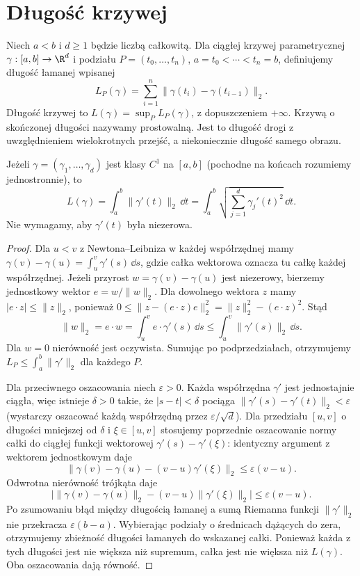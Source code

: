 \section{Długość krzywej}
\begin{definicja}
\label{ma1:def:curve-length}
Niech $a<b$ i $d\ge1$ będzie liczbą całkowitą. Dla ciągłej krzywej parametrycznej $\gamma:[a,b]\to\R^d$ i podziału $P=(t_0,\ldots,t_n)$, $a=t_0<\cdots<t_n=b$, definiujemy długość łamanej wpisanej
\[
 L_P(\gamma)=\sum_{i=1}^n\|\gamma(t_i)-\gamma(t_{i-1})\|_2.
\]
Długość krzywej to $L(\gamma)=\sup_P L_P(\gamma)$, z dopuszczeniem $+\infty$. Krzywą o skończonej długości nazywamy prostowalną. Jest to długość drogi z uwzględnieniem wielokrotnych przejść, a niekoniecznie długość samego obrazu.
\end{definicja}
\begin{twierdzenie}
\label{ma1:thm:curve-length}
Jeżeli $\gamma=(\gamma_1,\ldots,\gamma_d)$ jest klasy $C^1$ na $[a,b]$ (pochodne na końcach rozumiemy jednostronnie), to
\[
 L(\gamma)=\int_a^b\|\gamma'(t)\|_2\,\dd t
 =\int_a^b\sqrt{\sum_{j=1}^d\gamma_j'(t)^2}\,\dd t.
\]
Nie wymagamy, aby $\gamma'(t)$ była niezerowa.
\end{twierdzenie}
\begin{proof}
Dla $u<v$ z Newtona--Leibniza w każdej współrzędnej mamy $\gamma(v)-\gamma(u)=\int_u^v\gamma'(s)\,\dd s$, gdzie całka wektorowa oznacza tu całkę każdej współrzędnej. Jeżeli przyrost $w=\gamma(v)-\gamma(u)$ jest niezerowy, bierzemy jednostkowy wektor $e=w/\|w\|_2$. Dla dowolnego wektora $z$ mamy $|e\cdot z|\le\|z\|_2$, ponieważ $0\le\|z-(e\cdot z)e\|_2^2=\|z\|_2^2-(e\cdot z)^2$. Stąd
\[
 \|w\|_2=e\cdot w=\int_u^v e\cdot\gamma'(s)\,\dd s
 \le\int_u^v\|\gamma'(s)\|_2\,\dd s.
\]
Dla $w=0$ nierówność jest oczywista. Sumując po podprzedziałach, otrzymujemy $L_P\le\int_a^b\|\gamma'\|_2$ dla każdego $P$.

Dla przeciwnego oszacowania niech $\varepsilon>0$. Każda współrzędna $\gamma'$ jest jednostajnie ciągła, więc istnieje $\delta>0$ takie, że $|s-t|<\delta$ pociąga $\|\gamma'(s)-\gamma'(t)\|_2<\varepsilon$ (wystarczy oszacować każdą współrzędną przez $\varepsilon/\sqrt d$). Dla przedziału $[u,v]$ o długości mniejszej od $\delta$ i $\xi\in[u,v]$ stosujemy poprzednie oszacowanie normy całki do ciągłej funkcji wektorowej $\gamma'(s)-\gamma'(\xi)$: identyczny argument z wektorem jednostkowym daje
\[
 \|\gamma(v)-\gamma(u)-(v-u)\gamma'(\xi)\|_2
 \le\varepsilon(v-u).
\]
Odwrotna nierówność trójkąta daje
\[
 \big|\|\gamma(v)-\gamma(u)\|_2-(v-u)\|\gamma'(\xi)\|_2\big|
 \le\varepsilon(v-u).
\]
Po zsumowaniu błąd między długością łamanej a sumą Riemanna funkcji $\|\gamma'\|_2$ nie przekracza $\varepsilon(b-a)$. Wybierając podziały o średnicach dążących do zera, otrzymujemy zbieżność długości łamanych do wskazanej całki. Ponieważ każda z tych długości jest nie większa niż supremum, całka jest nie większa niż $L(\gamma)$. Oba oszacowania dają równość.
\end{proof}
